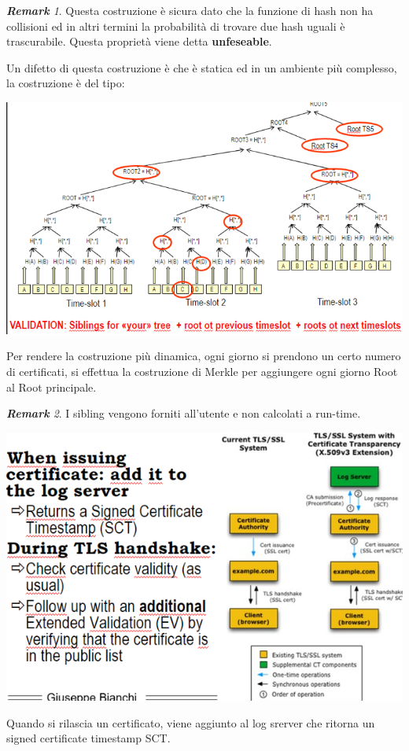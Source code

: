 \documentclass{book}
\theoremstyle{remark}
\newtheorem*{remark}{\textbf{Remark}}
\begin{document}
\begin{remark}
	Questa costruzione è sicura dato che la funzione di hash non ha collisioni ed in altri termini la probabilità di trovare due hash uguali è trascurabile\@. Questa proprietà viene detta \textbf{unfeseable}\@.
\end{remark}
Un difetto di questa costruzione è che è statica ed in un ambiente più complesso, la costruzione è del tipo:
\begin{center}
	\includegraphics[scale=0.6]{2021-12-09-16-19-42.png}
\end{center}
Per rendere la costruzione più dinamica, ogni giorno si prendono un certo numero di certificati, si effettua la costruzione di Merkle per aggiungere ogni giorno Root al Root principale.
\begin{remark}
	I sibling vengono forniti all'utente e non calcolati a run-time.
	\begin{center}
		\includegraphics[scale=0.6]{2021-12-09-16-25-58.png}
	\end{center}
	Quando si rilascia un certificato, viene aggiunto al log srerver che ritorna un signed certificate timestamp SCT\@.
\end{remark}
\end{document}
